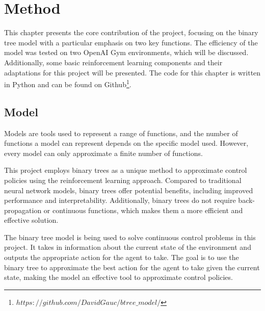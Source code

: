 
\chapter{Method}
\label{ch:method}

This chapter presents the core contribution of the project, focusing on the binary tree model with a particular emphasis on two key functions. The efficiency of the model was tested on two OpenAI Gym environments, which will be discussed. Additionally, some basic reinforcement learning components and their adaptations for this project will be presented. The code for this chapter is written in Python and can be found on Github\footnote{$https://github.com/DavidGauc/btree\_model/$}.

\section{Model}
Models are tools used to represent a range of functions, and the number of functions a model can represent depends on the specific model used. However, every model can only approximate a finite number of functions.

This project employs binary trees as a unique method to approximate control policies using the reinforcement learning approach. Compared to traditional neural network models, binary trees offer potential benefits, including improved performance and interpretability. Additionally, binary trees do not require back-propagation or continuous functions, which makes them a more efficient and effective solution.

The binary tree model is being used to solve continuous control problems in this project. It takes in information about the current state of the environment and outputs the appropriate action for the agent to take. The goal is to use the binary tree to approximate the best action for the agent to take given the current state, making the model an effective tool to approximate control policies.

